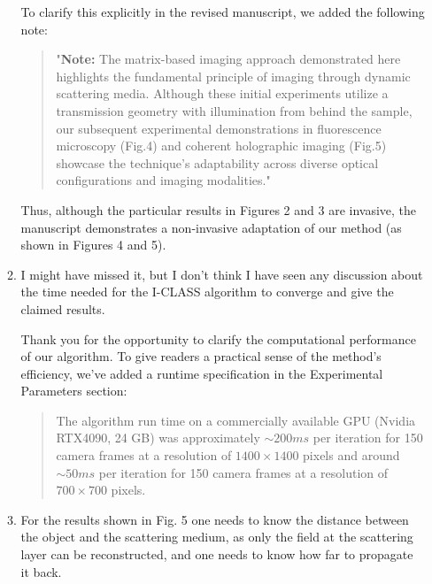 \documentclass[12pt]{article}
\newenvironment{solved_reviewercomment}
    {\begin{tcolorbox}[width=\linewidth,colback=gray!5,colframe=solved_commentcolor!50,title=Reviewer Comment,left=5pt,right=5pt]}
    {\end{tcolorbox}}
\newenvironment{ourresponse}
    {\begin{tcolorbox}[width=\linewidth,breakable,enhanced,colback=gray!5,colframe=responsecolor!50,title=Response,left=5pt,right=5pt]}
    {\end{tcolorbox}}
\begin{document}
\begin{enumerate}[label=\arabic*.]
\begin{enumerate}[label=3.\alph*.]
\begin{ourresponse}
            To clarify this explicitly in the revised manuscript, we added the following note:
            \begin{quote}
                "\textbf{Note:} The matrix-based imaging approach demonstrated here highlights the fundamental principle of imaging through dynamic scattering media. Although these initial experiments utilize a transmission geometry with illumination from behind the sample, our subsequent experimental demonstrations in fluorescence microscopy (Fig.4) and coherent holographic imaging (Fig.5) showcase the technique's adaptability across diverse optical configurations and imaging modalities."
            \end{quote}
            
            Thus, although the particular results in Figures 2 and 3 are invasive, the manuscript demonstrates a non-invasive adaptation of our method (as shown in Figures 4 and 5).
        \end{ourresponse}
       
        \item \leavevmode\vspace{-\baselineskip}
        \begin{solved_reviewercomment}
            I might have missed it, but I don't think I have seen any discussion about the time needed for the I-CLASS algorithm to converge and give the claimed results.
        \end{solved_reviewercomment}
        \begin{ourresponse}
            Thank you for the opportunity to clarify the computational performance of our algorithm. To give readers a practical sense of the method's efficiency, we've added a runtime specification in the Experimental Parameters section:
            
            \begin{quote}
                The algorithm run time on a commercially available GPU (Nvidia RTX4090, 24 GB) was approximately $\sim 200ms$ per iteration for 150 camera frames at a resolution of $1400 \times 1400$ pixels and around $\sim 50ms$ per iteration for 150 camera frames at a resolution of $700 \times 700$ pixels.
            \end{quote}
        \end{ourresponse}
            
            

        
        \item \leavevmode\vspace{-\baselineskip}
        \begin{solved_reviewercomment}
            For the results shown in Fig. 5 one needs to know the distance between the object and the scattering medium, as only the field at the scattering layer can be reconstructed, and one needs to know how far to propagate it back.
        \end{solved_reviewercomment}


\end{enumerate}
\end{enumerate}
\end{document}
